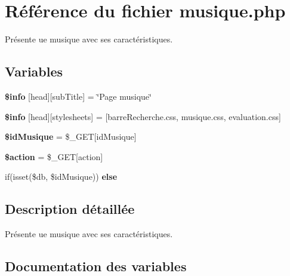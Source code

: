 \hypertarget{musique_8php}{}\section{Référence du fichier musique.\+php}
\label{musique_8php}


Présente ue musique avec ses caractéristiques.  


\subsection*{Variables}
\begin{DoxyCompactItemize}
\item 
\mbox{\label{musique_8php_a024f87f9bf4f3b33710e2e7ff8f60823}} 
{\bfseries \$info} \mbox{[}\textquotesingle{}head\textquotesingle{}\mbox{]}\mbox{[}\textquotesingle{}sub\+Title\textquotesingle{}\mbox{]} = \char`\"{}Page musique\char`\"{}
\item 
\mbox{\label{musique_8php_af6044c8bf78ebc8c58057e14d7738bbd}} 
{\bfseries \$info} \mbox{[}\textquotesingle{}head\textquotesingle{}\mbox{]}\mbox{[}\textquotesingle{}stylesheets\textquotesingle{}\mbox{]} = \mbox{[}\textquotesingle{}barre\+Recherche.\+css\textquotesingle{}, \textquotesingle{}musique.\+css\textquotesingle{}, \textquotesingle{}evaluation.\+css\textquotesingle{}\mbox{]}
\item 
\mbox{\label{musique_8php_a29391e8023617865b8749e5e096da8ff}} 
{\bfseries \$id\+Musique} = \$\+\_\+\+G\+ET\mbox{[}\textquotesingle{}id\+Musique\textquotesingle{}\mbox{]}
\item 
\mbox{\label{musique_8php_aa698a3e72116e8e778be0e95d908ee30}} 
{\bfseries \$action} = \$\+\_\+\+G\+ET\mbox{[}\textquotesingle{}action\textquotesingle{}\mbox{]}
\item 
if(isset(\$db, \$id\+Musique)) {\bfseries else}
\end{DoxyCompactItemize}


\subsection{Description détaillée}
Présente ue musique avec ses caractéristiques. 



\subsection{Documentation des variables}
\mbox{\label{musique_8php_a022a295592a3d754f9357f7f838644b3}} 
